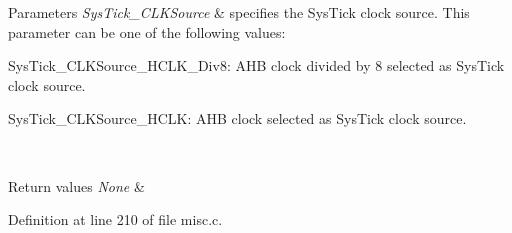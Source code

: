 \begin{DoxyParams}{Parameters}
{\em Sys\+Tick\+\_\+\+C\+L\+K\+Source} & specifies the Sys\+Tick clock source. This parameter can be one of the following values\+: \begin{DoxyItemize}
\item Sys\+Tick\+\_\+\+C\+L\+K\+Source\+\_\+\+H\+C\+L\+K\+\_\+\+Div8\+: A\+HB clock divided by 8 selected as Sys\+Tick clock source. \item Sys\+Tick\+\_\+\+C\+L\+K\+Source\+\_\+\+H\+C\+LK\+: A\+HB clock selected as Sys\+Tick clock source. \end{DoxyItemize}
\\
\hline
\end{DoxyParams}

\begin{DoxyRetVals}{Return values}
{\em None} & \\
\hline
\end{DoxyRetVals}


Definition at line 210 of file misc.\+c.

